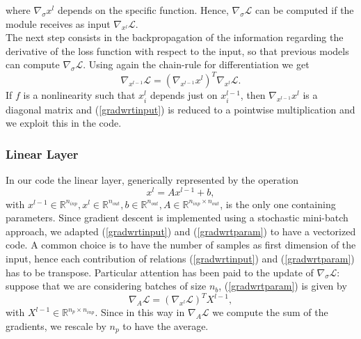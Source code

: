 \documentclass{article}
\begin{document}
where $\nabla_{\sigma} x^l$ depends on the specific function. Hence, $\nabla_{\sigma} \mathcal{L}$ can be computed if the module receives as input $\nabla_{x^l} \mathcal{L}$. \\
The next step consists in the backpropagation of the information regarding the derivative of the loss function with respect to the input, so that previous models can compute $\nabla_{\sigma} \mathcal{L}$. Using again the chain-rule for differentiation we get
\begin{equation}\label{gradwrtinput}
\nabla_{x^{l-1}}  \mathcal{L} = \left(  \nabla_{x^{l-1}}  x^{l} \right)^T  \nabla_{x^l} \mathcal{L}.
\end{equation}
If $f$ is a nonlinearity such that $x^l_i$ depends just on $x^{l-1}_i$, then $\nabla_{x^{l-1}} x^l$ is a diagonal matrix and (\ref{gradwrtinput}) is reduced to a pointwise multiplication and we exploit this in the code.
\subsubsection{Linear Layer}
In our code the linear layer, generically represented by the operation
\begin{equation*}
x^l = A x^{l-1} + b , 
\end{equation*}
with $x^{l-1}\in \mathbb{R}^{n_{inp}}, x^{l}\in \mathbb{R}^{n_{out}}, b\in \mathbb{R}^{n_{out}}, A\in \mathbb{R}^{n_{inp}\times n_{out}}$, is the only one containing parameters. Since gradient descent is implemented using a stochastic mini-batch approach, we adapted (\ref{gradwrtinput}) and (\ref{gradwrtparam}) to have a vectorized code. A common choice is to have the number of samples as first dimension of the input, hence each contribution of relations (\ref{gradwrtinput}) and (\ref{gradwrtparam}) has to be transpose. Particular attention has been paid to the update of $\nabla_{\sigma} \mathcal{L}$: suppose that we are considering batches of size $n_b$,  (\ref{gradwrtparam}) is given by
\begin{equation*}
\nabla_{A} \mathcal{L} =\left (\nabla_{x^l} \mathcal{L} \right )^T  X^{l-1} ,
\end{equation*}
with $X^{l-1}\in\mathbb{R}^{n_p \times n_{inp}}$. Since in this way in $\nabla_{A} \mathcal{L}$ we compute the sum of the gradients, we rescale by $n_p$ to have the average.
\end{document}
